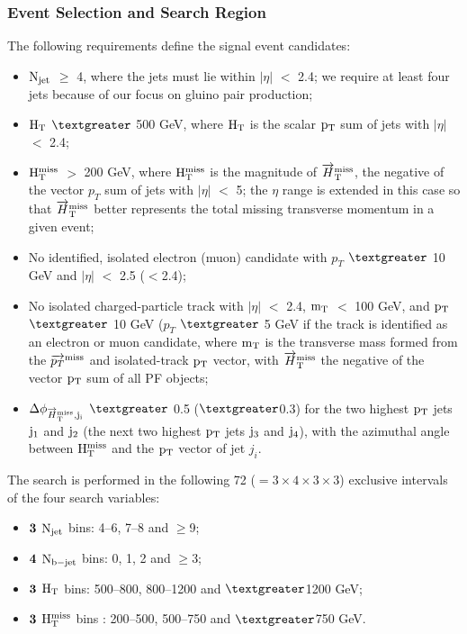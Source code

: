 \subsubsection{Event Selection and Search Region}  
The following requirements define the  signal event candidates:
\begin{itemize}
\item $\rm N_{jet}$ $\geq$ 4, where the jets must lie within $|\eta|$ $<$ 2.4; we require at least four jets because of
our focus on gluino pair production;
\item $\rm H_{T}$ $\textgreater $ 500 GeV, where $\rm H_{T}$ is the scalar $\rm p_{T}$ sum of jets with $|\eta|$ $<$ 2.4;

\item $\rm H_{T}^{miss}$ $>$ 200 GeV, where $\rm H_{T}^{miss}$ is the magnitude of $\rm \overrightarrow{H}_{T}^{miss}$, the negative of the vector
$p_{T}$ sum of jets with $|\eta|$ $<$ 5; the $\eta$ range is extended in this case so that  ${\rm \overrightarrow{H}_{T}^{miss}}$ better
represents the total missing transverse momentum in a given event;

\item  No identified, isolated electron (muon) candidate with $p_{T}$ $\textgreater$ 10 GeV and $|\eta|$ $<$ 2.5 ($<$2.4);

\item No isolated charged-particle track with $|\eta|$ $<$  2.4, $\rm m_{T}$ $<$ 100 GeV, and $\rm p_{T}$ $\textgreater $ 10 GeV
($p_{T}$ $\textgreater$ 5 GeV if the track is identified as an electron or muon candidate, where $\rm m_{T}$ is the transverse mass formed from the ${\rm \overrightarrow{p_{T}}^{miss}}$ and isolated-track
$\rm p_{T}$ vector, with ${\rm \overrightarrow{H}_{T}^{miss}}$ the negative of the vector  $\rm p_{T}$ sum of all PF objects;

\item  $\Delta \phi_{\rm \overrightarrow{H}_{T}^{miss},j_{i}}$  $\textgreater$ 0.5 ($\textgreater$0.3) for the two highest $\rm p_{T}$ jets $\rm j_{1}$ and $\rm j_{2}$ (the next two highest $\rm p_{T}$ jets
$\rm j_{3}$ and $\rm j_{4}$), with   the azimuthal angle between $\rm H_{T}^{miss}$ and the $\rm p_{T}$ vector of jet $j_{i}$.

\end{itemize}
The search is performed in the following 72 ($=3\times4\times3\times3$) exclusive intervals of the four search variables:
\begin{itemize}

 \item ${\bf 3 }$ $\rm N_{jet}$ bins: 4–6, 7–8 and $\geq$9;
 \item ${\bf 4 }$ $\rm N_{b-jet}$ bins: 0, 1, 2 and $\geq$3;
 \item ${\bf 3 }$ $\rm H_{T}$ bins: 500–800, 800–1200 and $\textgreater$1200 GeV;
 \item ${\bf 3 }$ $\rm H_{T}^{miss}$ bins : 200–500, 500–750 and $\textgreater$750 GeV.
\end{itemize}

